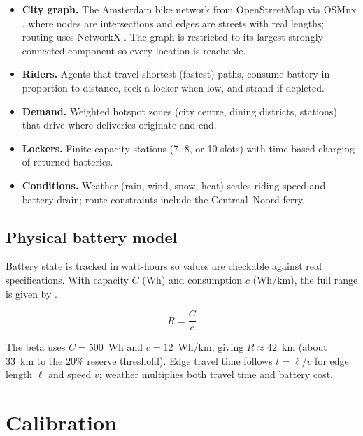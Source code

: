 \documentclass[9pt,a4paper,twocolumn,twoside]{rho-class/rho}
\begin{document}
    \begin{itemize}
        \item \textbf{City graph.} The Amsterdam bike network from
        OpenStreetMap via OSMnx \cite{boeing2017osmnx}, where nodes are
        intersections and edges are streets with real lengths; routing uses
        NetworkX \cite{hagberg2008networkx}. The graph is restricted to its largest strongly connected
        component so every location is reachable.
        \item \textbf{Riders.} Agents that travel shortest (fastest) paths,
        consume battery in proportion to distance, seek a locker when low, and
        strand if depleted.
        \item \textbf{Demand.} Weighted hotspot zones (city centre, dining
        districts, stations) that drive where deliveries originate and end.
        \item \textbf{Lockers.} Finite-capacity stations (7, 8, or 10 slots)
        with time-based charging of returned batteries.
        \item \textbf{Conditions.} Weather (rain, wind, snow, heat) scales
        riding speed and battery drain; route constraints include the
        Centraal--Noord ferry.
    \end{itemize}

    \subsection{Physical battery model}

        Battery state is tracked in watt-hours so values are checkable against
        real specifications. With capacity $C$ (Wh) and consumption $c$
        (Wh/km), the full range is given by .

        \begin{equation}\label{eq:range}
            R = \frac{C}{c}
        \end{equation}

        The beta uses $C=500$~Wh and $c=12$~Wh/km, giving $R \approx 42$~km
        (about 33~km to the 20\% reserve threshold). Edge travel time follows
        $t = \ell / v$ for edge length $\ell$ and speed $v$; weather multiplies
        both travel time and battery cost.

\section{Calibration}
\end{document}
